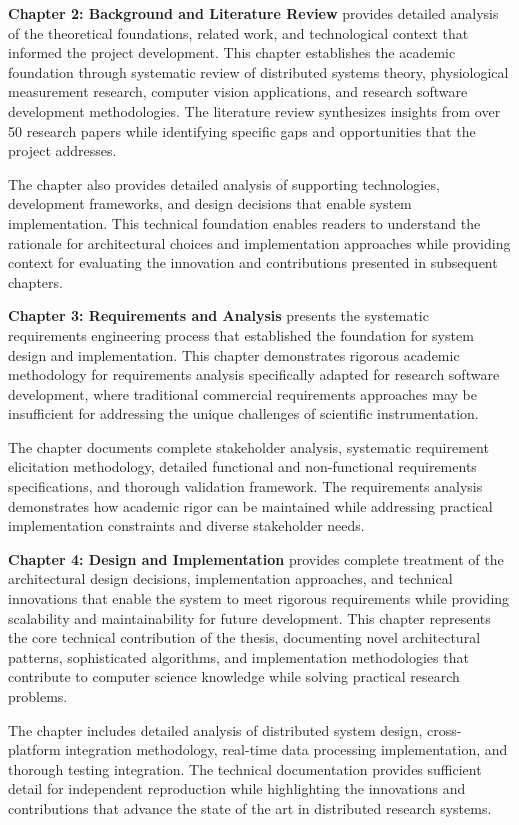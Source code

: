 \documentclass[11pt,a4paper]{article}
\begin{document}
\textbf{Chapter 2: Background and Literature Review} provides detailed analysis of the theoretical foundations, related
work, and technological context that informed the project development. This
chapter establishes the academic foundation
through systematic review of distributed systems theory, physiological
measurement research, computer vision
applications, and research software development methodologies. The literature
review synthesizes insights from over 50
research papers while identifying specific gaps and opportunities that the
project addresses.

The chapter also provides detailed analysis of supporting technologies,
development frameworks, and design decisions
that enable system implementation. This technical foundation enables readers to
understand the rationale for
architectural choices and implementation approaches while providing context for
evaluating the innovation and
contributions presented in subsequent chapters.

\textbf{Chapter 3: Requirements and Analysis} presents the systematic requirements engineering process that established the
foundation for system design and implementation. This chapter demonstrates
rigorous academic methodology for
requirements analysis specifically adapted for research software development,
where traditional commercial requirements
approaches may be insufficient for addressing the unique challenges of
scientific instrumentation.

The chapter documents complete stakeholder analysis, systematic requirement
elicitation methodology, detailed
functional and non-functional requirements specifications, and thorough
validation framework. The requirements
analysis demonstrates how academic rigor can be maintained while addressing
practical implementation constraints and
diverse stakeholder needs.

\textbf{Chapter 4: Design and Implementation} provides complete treatment of the architectural design decisions,
implementation approaches, and technical innovations that enable the system to
meet rigorous requirements while
providing scalability and maintainability for future development. This chapter
represents the core technical
contribution of the thesis, documenting novel architectural patterns,
sophisticated algorithms, and implementation
methodologies that contribute to computer science knowledge while solving
practical research problems.

The chapter includes detailed analysis of distributed system design,
cross-platform integration methodology, real-time
data processing implementation, and thorough testing integration. The technical
documentation provides sufficient
detail for independent reproduction while highlighting the innovations and
contributions that advance the state of the
art in distributed research systems.
\end{document}
